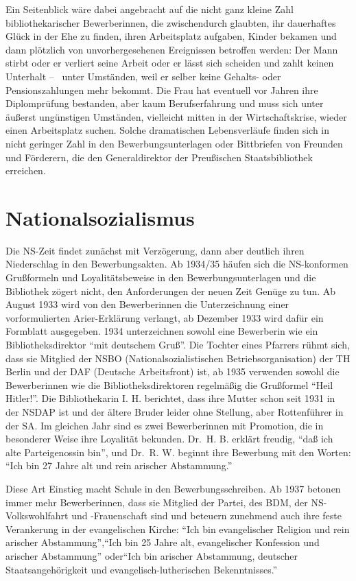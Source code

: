 \documentclass[a4paper,
fontsize=11pt,
oneside,
numbers=noperiodatend,
parskip=half-,
bibliography=totoc,
final
]{scrartcl}
\begin{document}
Ein Seitenblick wäre dabei angebracht auf die nicht ganz kleine Zahl
bibliothekarischer Bewerberinnen, die zwischendurch glaubten, ihr
dauerhaftes Glück in der Ehe zu finden, ihren Arbeitsplatz aufgaben,
Kinder bekamen und dann plötzlich von unvorhergesehenen Ereignissen
betroffen werden: Der Mann stirbt oder er verliert seine Arbeit oder er
lässt sich scheiden und zahlt keinen Unterhalt --~ unter Umständen, weil
er selber keine Gehalts- oder Pensionszahlungen mehr bekommt. Die Frau
hat eventuell vor Jahren ihre Diplomprüfung bestanden, aber kaum
Berufserfahrung und muss sich unter äußerst ungünstigen Umständen,
vielleicht mitten in der Wirtschaftskrise, wieder einen Arbeitsplatz
suchen. Solche dramatischen Lebensverläufe finden sich in nicht geringer
Zahl in den Bewerbungsunterlagen oder Bittbriefen von Freunden und
Förderern, die den Generaldirektor der Preußischen Staatsbibliothek
erreichen.

\section*{Nationalsozialismus}\label{nationalsozialismus}

Die NS-Zeit findet zunächst mit Verzögerung, dann aber deutlich ihren
Niederschlag in den Bewerbungsakten. Ab 1934/35 häufen sich die
NS-konformen Grußformeln und Loyalitätsbeweise in den
Bewerbungsunterlagen und die Bibliothek zögert nicht, den Anforderungen
der neuen Zeit Genüge zu tun. Ab August 1933 wird von den Bewerberinnen
die Unterzeichnung einer vorformulierten Arier-Erklärung verlangt, ab
Dezember 1933 wird dafür ein Formblatt ausgegeben. 1934 unterzeichnen
sowohl eine Bewerberin wie ein Bibliotheksdirektor \enquote{mit
deutschem Gruß}. Die Tochter eines Pfarrers rühmt sich, dass sie
Mitglied der NSBO (Nationalsozialistischen Betriebsorganisation) der TH
Berlin und der DAF (Deutsche Arbeitsfront) ist, ab 1935 verwenden sowohl
die Bewerberinnen wie die Bibliotheksdirektoren regelmäßig die
Grußformel \enquote{Heil Hitler!}. Die Bibliothekarin I. H. berichtet,
dass ihre Mutter schon seit 1931 in der NSDAP ist und der ältere Bruder
leider ohne Stellung, aber Rottenführer in der SA. Im gleichen Jahr sind
es zwei Bewerberinnen mit Promotion, die in besonderer Weise ihre
Loyalität bekunden. Dr.~H. B. erklärt freudig, \enquote{daß ich alte
Parteigenossin bin}, und Dr.~R. W. beginnt ihre Bewerbung mit den
Worten: \enquote{Ich bin 27 Jahre alt und rein arischer Abstammung.}

Diese Art Einstieg macht Schule in den Bewerbungsschreiben. Ab 1937
betonen immer mehr Bewerberinnen, dass sie Mitglied der Partei, des BDM,
der NS-Volkswohlfahrt und -Frauenschaft sind und beteuern zunehmend auch
ihre feste Verankerung in der evangelischen Kirche: \enquote{Ich bin
evangelischer Religion und rein arischer Abstammung},\enquote{Ich bin 25
Jahre alt, evangelischer Konfession und arischer Abstammung}
oder\enquote{Ich bin arischer Abstammung, deutscher Staatsangehörigkeit
und evangelisch-lutherischen Bekenntnisses.}
\end{document}
